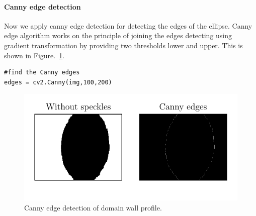 \documentclass[12pt, twoside, a4paper]{article}
\begin{document}
\paragraph{Canny edge detection}
Now we apply canny edge detection for detecting the edges of the ellipse. Canny edge algorithm works on the principle of joining the edges detecting using gradient transformation by providing two thresholds lower and upper. This is shown in Figure.~\ref{openCV canny edge}.
%
\begin{verbatim}
#find the Canny edges
edges = cv2.Canny(img,100,200)
\end{verbatim}
%
%
\begin{figure}[!htbp]
	\centering
	\includegraphics[scale=1.0]{figures/06_CannyEdgeEffect.pdf}
	\caption{Canny edge detection of domain wall profile.
	}
	\label{openCV canny edge}
\end{figure}
%
\end{document}
